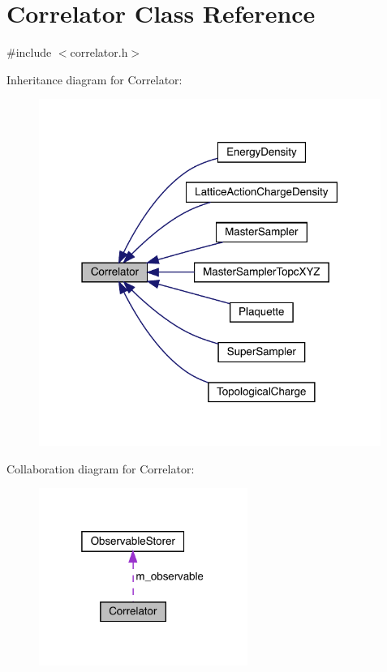 \hypertarget{class_correlator}{}\section{Correlator Class Reference}
\label{class_correlator}


{\ttfamily \#include $<$correlator.\+h$>$}



Inheritance diagram for Correlator\+:\nopagebreak
\begin{figure}[H]
\begin{center}
\leavevmode
\includegraphics[width=316pt]{class_correlator__inherit__graph}
\end{center}
\end{figure}


Collaboration diagram for Correlator\+:\nopagebreak
\begin{figure}[H]
\begin{center}
\leavevmode
\includegraphics[width=193pt]{class_correlator__coll__graph}
\end{center}
\end{figure}
